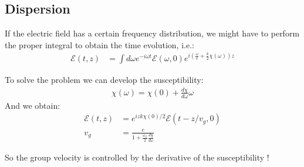 \documentclass[10pt]{article}
\begin{document}
\subsection{Dispersion}
If the electric field has a certain frequency distribution, we might have to perform the proper integral to obtain the time evolution, i.e.:
\begin{align}
\mathcal{E}(t, z) &=\int d\omega e^{-i\omega t}\mathcal{E}(\omega,0) e^{i\left(\frac{\omega}{c} +\frac{k}{2}\chi(\omega)\right)z}
\end{align}

To solve the problem we can develop the susceptibility:
\begin{align}
\chi(\omega) = \chi(0)+\frac{d\chi}{d\omega}\omega
\end{align}
And we obtain:
\begin{align}
\mathcal{E}(t, z) &=e^{izk\chi(0)/2}
\mathcal{E}(t-z/v_g, 0)\\
v_g &= \frac{c}{1+\frac{\omega_L}{2}\frac{d\chi}{d\omega}}
\end{align}

So the group velocity is controlled by the derivative of the susceptibility !
\end{document}
